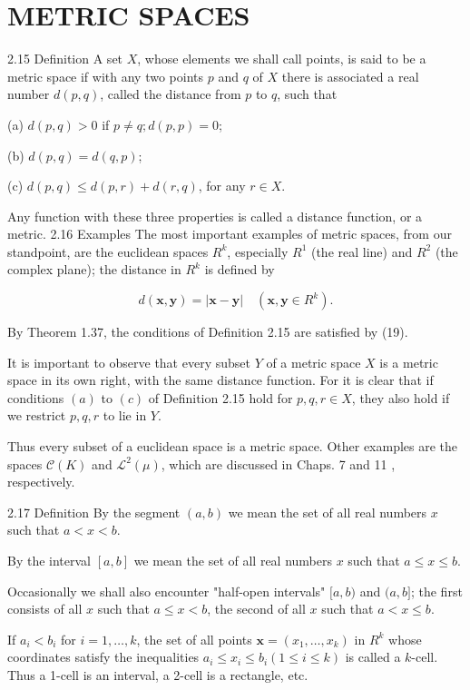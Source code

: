 \documentclass[10pt]{article}
\begin{document}
\section{METRIC SPACES}
2.15 Definition A set $X$, whose elements we shall call points, is said to be a metric space if with any two points $p$ and $q$ of $X$ there is associated a real number $d(p, q)$, called the distance from $p$ to $q$, such that

(a) $d(p, q)>0$ if $p \neq q ; d(p, p)=0$;

(b) $d(p, q)=d(q, p)$;

(c) $d(p, q) \leq d(p, r)+d(r, q)$, for any $r \in X$.

Any function with these three properties is called a distance function, or a metric. 2.16 Examples The most important examples of metric spaces, from our standpoint, are the euclidean spaces $R^{k}$, especially $R^{1}$ (the real line) and $R^{2}$ (the complex plane); the distance in $R^{k}$ is defined by

$$
d(\mathbf{x}, \mathbf{y})=|\mathbf{x}-\mathbf{y}| \quad\left(\mathbf{x}, \mathbf{y} \in R^{k}\right) .
$$

By Theorem 1.37, the conditions of Definition 2.15 are satisfied by (19).

It is important to observe that every subset $Y$ of a metric space $X$ is a metric space in its own right, with the same distance function. For it is clear that if conditions $(a)$ to $(c)$ of Definition 2.15 hold for $p, q, r \in X$, they also hold if we restrict $p, q, r$ to lie in $Y$.

Thus every subset of a euclidean space is a metric space. Other examples are the spaces $\mathscr{C}(K)$ and $\mathscr{L}^{2}(\mu)$, which are discussed in Chaps. 7 and 11 , respectively.

2.17 Definition By the segment $(a, b)$ we mean the set of all real numbers $x$ such that $a<x<b$.

By the interval $[a, b]$ we mean the set of all real numbers $x$ such that $a \leq x \leq b$.

Occasionally we shall also encounter "half-open intervals" $[a, b)$ and $(a, b]$; the first consists of all $x$ such that $a \leq x<b$, the second of all $x$ such that $a<x \leq b$.

If $a_{i}<b_{i}$ for $i=1, \ldots, k$, the set of all points $\mathbf{x}=\left(x_{1}, \ldots, x_{k}\right)$ in $R^{k}$ whose coordinates satisfy the inequalities $a_{i} \leq x_{i} \leq b_{i}(1 \leq i \leq k)$ is called a $k$-cell. Thus a 1-cell is an interval, a 2-cell is a rectangle, etc.
\end{document}
